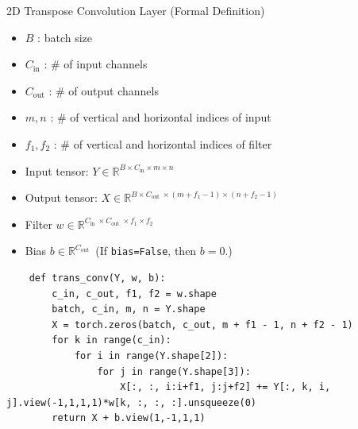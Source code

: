 \begin{frame}[allowframebreaks]

\begin{mydefinitionblock}{8.16}{2D Transpose Convolution Layer (Formal Definition)}
    \begin{itemize}
        \item $B$ : batch size
        \item $C_{\text{in}}$ : \# of input channels
        \item $C_{\text{out}}$ : \# of output channels
        \item $m, n$ : \# of vertical and horizontal indices of input
        \item $f_1, f_2$ : \# of vertical and horizontal indices of filter
    \end{itemize}

    \par\noindent\textcolor{gray}{\hdashrule{\textwidth}{0.4pt}{1pt 2pt}}

    \begin{itemize}
        \item Input tensor: $Y \in \mathbb{R}^{B \times C_{\mathrm{in}} \times m \times n}$
        \item Output tensor: $X \in \mathbb{R}^{B \times C_{\text {out }} \times\left(m+f_{1}-1\right) \times\left(n+f_{2}-1\right)}$
        \item Filter $w \in \mathbb{R}^{C_{\text {in }} \times C_{\text {out }} \times f_{1} \times f_{2}}$
        \item Bias $b \in \mathbb{R}^{C_{\text {out }}}$ (If \verb|bias=False|, then $b=0$.) 
    \end{itemize}

    \par\noindent\textcolor{gray}{\hdashrule{\textwidth}{0.4pt}{1pt 2pt}}

    \begin{verbatim}
    def trans_conv(Y, w, b):
        c_in, c_out, f1, f2 = w.shape
        batch, c_in, m, n = Y.shape
        X = torch.zeros(batch, c_out, m + f1 - 1, n + f2 - 1)
        for k in range(c_in):
            for i in range(Y.shape[2]):
                for j in range(Y.shape[3]):
                    X[:, :, i:i+f1, j:j+f2] += Y[:, k, i, j].view(-1,1,1,1)*w[k, :, :, :].unsqueeze(0)
        return X + b.view(1,-1,1,1)
    \end{verbatim}
\end{mydefinitionblock}

\end{frame}



